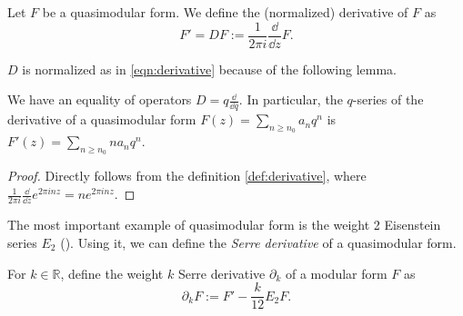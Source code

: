 \begin{definition}\label{def:derivative}  \leanok
Let $F$ be a quasimodular form.
We define the (normalized) derivative of $F$ as
\begin{equation}\label{eqn:derivative}
    F' = DF := \frac{1}{2\pi i} \frac{\dd}{\dd z} F.
\end{equation}
\end{definition}

$D$ is normalized as in \eqref{eqn:derivative} because of the following lemma.
\begin{lemma}\label{lemma:der-q-series}
We have an equality of operators $D = q \frac{\dd}{\dd q}$.
In particular, the $q$-series of the derivative of a quasimodular form $F(z) = \sum_{n \ge n_0} a_n q^n$ is $F'(z) = \sum_{n \ge n_0} n a_n q^n$.
\end{lemma}
\begin{proof}
Directly follows from the definition \eqref{def:derivative}, where $\frac{1}{2 \pi i}\frac{\dd}{\dd z}e^{2\pi i n z} = n e^{2\pi i n z}$.
\end{proof}

The most important example of quasimodular form is the weight 2 Eisenstein series $E_2$ ().
Using it, we can define the \emph{Serre derivative} of a quasimodular form.

\begin{definition}\label{def:serre-der}\leanok {}
For $k \in \mathbb{R}$, define the weight $k$ Serre derivative $\partial_{k}$ of a modular form $F$ as
\begin{equation}\label{eqn:serre-der}
    \partial_{k}F := F' - \frac{k}{12} E_2 F.
\end{equation}
\end{definition}

